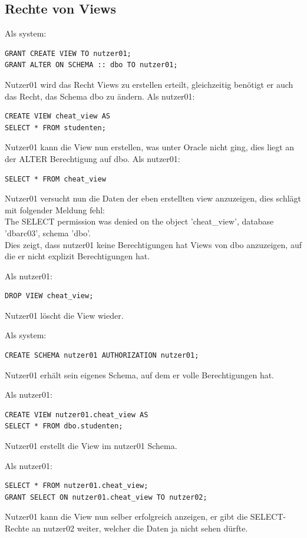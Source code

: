 \documentclass[10pt]{scrreprt}
\begin{document}
\subsection{Rechte von Views}
Als system:
\begin{lstlisting}[style=sql]
GRANT CREATE VIEW TO nutzer01;
GRANT ALTER ON SCHEMA :: dbo TO nutzer01;
\end{lstlisting}
Nutzer01 wird das Recht Views zu erstellen erteilt, gleichzeitig benötigt er auch das Recht, das Schema dbo zu ändern.
\newpage
Als nutzer01:
\begin{lstlisting}[style=sql]
CREATE VIEW cheat_view AS
SELECT * FROM studenten;
\end{lstlisting}
Nutzer01 kann die View nun erstellen, was unter Oracle nicht ging, dies liegt an der ALTER Berechtigung auf dbo.
Als nutzer01:
\begin{lstlisting}[style=sql]
SELECT * FROM cheat_view
\end{lstlisting}
Nutzer01 versucht nun die Daten der eben erstellten view anzuzeigen, dies schlägt mit folgender Meldung fehl:\\
The SELECT permission was denied on the object 'cheat\_view', database 'dbarc03', schema 'dbo'.\\
Dies zeigt, dass nutzer01 keine Berechtigungen hat Views von dbo anzuzeigen, auf die er nicht explizit Berechtigungen hat.

Als nutzer01:
\begin{lstlisting}[style=sql]
DROP VIEW cheat_view;
\end{lstlisting}
Nutzer01 löscht die View wieder.

Als system:
\begin{lstlisting}[style=sql]
CREATE SCHEMA nutzer01 AUTHORIZATION nutzer01;
\end{lstlisting}
Nutzer01 erhält sein eigenes Schema, auf dem er volle Berechtigungen hat.

Als nutzer01:
\begin{lstlisting}[style=sql]
CREATE VIEW nutzer01.cheat_view AS
SELECT * FROM dbo.studenten;
\end{lstlisting}
Nutzer01 erstellt die View im nutzer01 Schema.

Als nutzer01:
\begin{lstlisting}[style=sql]
SELECT * FROM nutzer01.cheat_view;
GRANT SELECT ON nutzer01.cheat_view TO nutzer02;
\end{lstlisting}
Nutzer01 kann die View nun selber erfolgreich anzeigen, er gibt die SELECT-Rechte an nutzer02 weiter, welcher die Daten ja nicht sehen dürfte.
\end{document}
